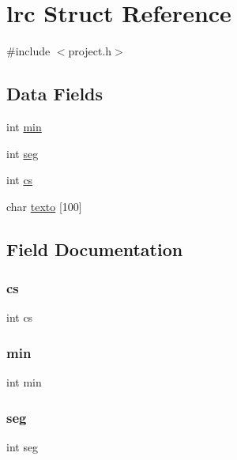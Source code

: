 \hypertarget{structlrc}{}\section{lrc Struct Reference}
\label{structlrc}


{\ttfamily \#include $<$project.\+h$>$}

\subsection*{Data Fields}
\begin{DoxyCompactItemize}
\item 
int \mbox{\hyperlink{structlrc_a3e202b201e6255d975cd6d3aff1f5a4d}{min}}
\item 
int \mbox{\hyperlink{structlrc_a1d5f6f91d20f3974c9d03f6bb56afc27}{seg}}
\item 
int \mbox{\hyperlink{structlrc_ad35c7ed2784f4fb57849237ce534f17e}{cs}}
\item 
char \mbox{\hyperlink{structlrc_a0483fa55a1e6e8682a762fdb280d18d2}{texto}} \mbox{[}100\mbox{]}
\end{DoxyCompactItemize}


\subsection{Field Documentation}
\mbox{\label{structlrc_ad35c7ed2784f4fb57849237ce534f17e}} 
\subsubsection{\texorpdfstring{cs}{cs}}
{\footnotesize\ttfamily int cs}

\mbox{\label{structlrc_a3e202b201e6255d975cd6d3aff1f5a4d}} 
\subsubsection{\texorpdfstring{min}{min}}
{\footnotesize\ttfamily int min}

\mbox{\label{structlrc_a1d5f6f91d20f3974c9d03f6bb56afc27}} 
\subsubsection{\texorpdfstring{seg}{seg}}
{\footnotesize\ttfamily int seg}

